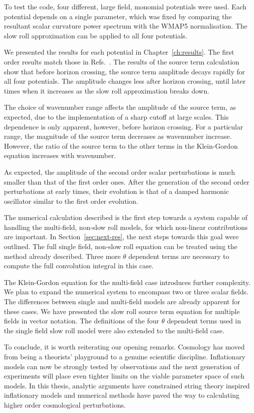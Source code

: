 To test the code, four different, large field, monomial potentials were used. Each
potential depends on a single parameter, which was fixed by comparing the resultant scalar
curvature power spectrum with the WMAP5 normalisation. The slow roll
approximation can be applied to all four potentials.

We presented the results for each potential in Chapter~\ref{ch:results}. The first
order results match those in Refs.~\cite{Martin:2006rs, Ringeval:2007am, Salopek:1988qh}. The
results of the source term calculation show that before
horizon crossing, the source term amplitude decays rapidly for all four potentials.
The amplitude changes less after horizon crossing, until later times when it increases
as the slow roll approximation breaks down.

The choice of wavenumber range affects the amplitude of the source term, as
expected, due to the implementation of a sharp cutoff at large scales. This
dependence is only apparent, however, before horizon crossing. For a particular
range,  the magnitude of the source term decreases as wavenumber increase. However,
the ratio of the source term to the other terms in the Klein-Gordon equation increases with
wavenumber. 

As expected, the amplitude of the second order scalar perturbations is much smaller
than that of the first order ones. After the generation of the second order
perturbations at early times, their evolution is that of a damped harmonic
oscillator similar to the first order evolution.


The numerical calculation described is the first step towards a system capable of
handling the multi-field, non-slow roll models, for which non-linear contributions
are important. In Section~\ref{sec:next-res}, the next steps towards this goal were
outlined. The full single field, non-slow roll equation can be treated using the
method already described. Three more $\theta$ dependent terms are necessary to
compute the full convolution integral in this case. 

The Klein-Gordon equation for the multi-field case introduces further complexity. We plan to
expand the numerical system to encompass two or three scalar fields. The differences
between single and multi-field models are already apparent for these cases. We have
presented the slow roll source term equation for multiple fields in vector notation.
The definitions of the four $\theta$ dependent terms used in the single
field slow roll model were also extended to the multi-field case. 


To conclude, it is worth reiterating our opening remarks. Cosmology has moved from
being a theorists' playground to a genuine scientific discipline. Inflationary models can
now be strongly tested by observations and the next generation of experiments will
place even tighter limits on the viable parameter space of such models. In this thesis, analytic
arguments have constrained string theory inspired inflationary models and numerical
methods have paved the way to calculating higher order cosmological perturbations.